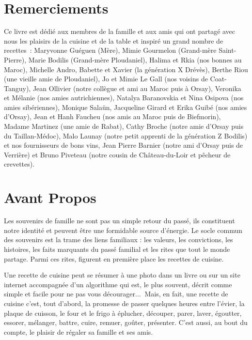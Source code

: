 


\section*{Remerciements}
Ce livre est dédié aux membres de la famille et aux amis qui ont partagé avec nous les plaisirs de la cuisine et de la table et inspiré un grand nombre de recettes :
Maryvonne Guéguen (Mère), Mimie Gourmelon (Grand-mère Saint-Pierre), Marie Bodilis (Grand-mère Ploudaniel), Halima et Rkia (nos  bonnes au Maroc),  Michelle Andro, Babette et Xavier (la génération X Drévès), Berthe Riou (une vieille amie de Ploudaniel), Jo et Mimie Le Gall (nos voisins de Coat-Tanguy), Jean Ollivier (notre collègue et ami au Maroc puis à Orsay), Veronika et Mélanie (nos amies autrichiennes), Natalya Baranovskia et Nina Osipova (nos amies sibériennes), Monique Salaün, Jacqueline Girard et Erika Guibé (nos amies d’Orsay), Jean et Hanh Faucheu (nos amis au Maroc puis de Biefmorin), Madame Martinez (une amie de Rabat), Cathy Broche (notre amie d’Orsay puis du Taillan-Médoc), Malo Launay (notre petit apprenti de la génération Z Bodilis) et nos fournisseurs de bons vins, Jean Pierre Barnier (notre ami d’Orsay puis de Verrière) et Bruno Piveteau (notre cousin de Château-du-Loir et pêcheur de crevettes).
\newpage
\ %
\newpage

\section*{Avant Propos}
Les souvenirs de famille ne sont pas un simple retour du passé, ils constituent notre identité et peuvent être une formidable source d’énergie. Le socle commun des souvenirs est la trame des liens familiaux : les valeurs, les convictions, les histoires, les faits marquants du passé familial et les rites que tout le monde partage. Parmi ces rites, figurent en première place les recettes de cuisine.

Une recette de cuisine peut se résumer à une photo dans un livre ou sur un site internet accompagnée d’un algorithme qui est, le plus souvent, décrit comme simple et facile pour ne pas vous décourager$\ldots~$ Mais, en fait, une recette de cuisine c’est, tout d'abord, la promesse de passer quelques heures entre l’évier, la plaque de cuisson, le four et le frigo à éplucher, découper, parer, laver, égoutter, essorer, mélanger, battre, cuire, remuer, goûter, présenter.
C'est aussi, au bout du compte, le plaisir de régaler sa famille et ses amis.

